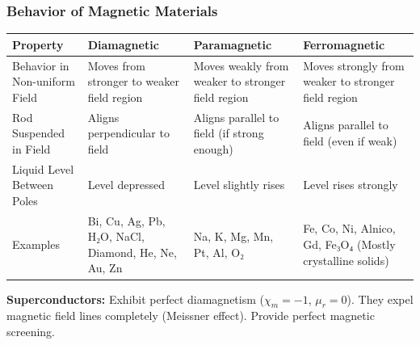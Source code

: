 \transfade[duration=0.5]

\begin{frame}[t]
    \frametitle{\textcolor{deepnavy}{\textbf{Behavior of Magnetic Materials}}}
    \renewcommand{\familydefault}{\rmdefault}
    \tiny %

    \begin{table}
    \centering
    \renewcommand{\arraystretch}{1.1}
    \begin{tabular}{|p{3cm}|p{3.5cm}|p{3.5cm}|p{3.5cm}|}
        \hline
        \rowcolor{gray!20} \textbf{Property} & \textbf{Diamagnetic} & \textbf{Paramagnetic} & \textbf{Ferromagnetic} \\ \hline
          Behavior in Non-uniform Field & Moves from stronger to weaker field region   & Moves weakly from weaker to stronger field region   & Moves strongly from weaker to stronger field region \\ \hline
          Rod Suspended in Field & Aligns perpendicular to field   & Aligns parallel to field (if strong enough)   & Aligns parallel to field (even if weak) \\ \hline
          Liquid Level Between Poles & Level depressed   & Level slightly rises   & Level rises strongly \\ \hline
          Examples & Bi, Cu, Ag, Pb, H₂O, NaCl, Diamond, He, Ne, Au, Zn   & Na, K, Mg, Mn, Pt, Al, O₂   & Fe, Co, Ni, Alnico, Gd, Fe₃O₄ (Mostly crystalline solids) \\ \hline
    \end{tabular}
    \end{table}

    \vspace{0.5em}

      \item<+-> \textbf{Superconductors:} Exhibit perfect diamagnetism ($\chi_m = -1$, $\mu_r = 0$).   They expel magnetic field lines completely (Meissner effect).   Provide perfect magnetic screening.
\end{frame}


\transfade[duration=0.5]

